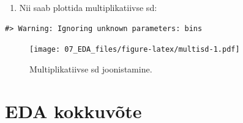 \documentclass[]{book}
\providecommand{\tightlist}{%
  \setlength{\itemsep}{0pt}\setlength{\parskip}{0pt}}
\begin{document}
\begin{enumerate}
\def\labelenumi{\arabic{enumi}.}
\setcounter{enumi}{10}
\tightlist
\item
  Nii saab plottida multiplikatiivse sd:
\end{enumerate}



\begin{verbatim}
#> Warning: Ignoring unknown parameters: bins
\end{verbatim}

\begin{figure}
\centering
\texttt{[image: 07\_EDA\_files/figure-latex/multisd-1.pdf]}
\caption{\label{fig:multisd}Multiplikatiivse sd joonistamine.}
\end{figure}

\section{EDA kokkuvõte}\label{eda-kokkuvote}
\end{document}
